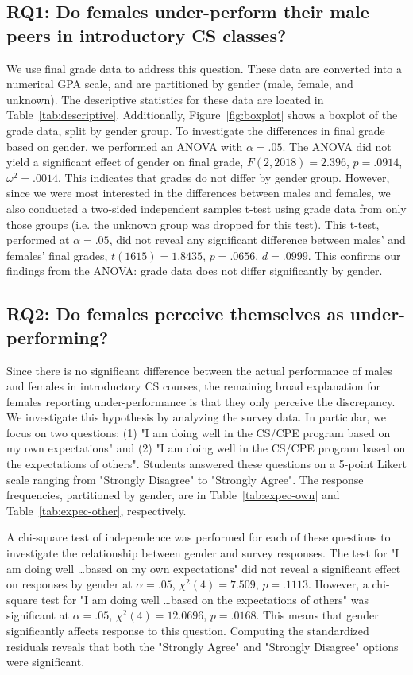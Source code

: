 \documentclass[a4paper,man,natbib]{apa6}
\begin{document}
\subsection{RQ1: Do females under-perform their male peers in introductory CS classes?}
We use final grade data to address this question. These data are converted into a
numerical GPA scale, and are partitioned by gender (male, female, and unknown).
The descriptive statistics for these data are located in Table~\ref{tab:descriptive}.
Additionally, Figure~\ref{fig:boxplot} shows a boxplot of the grade data, split
by gender group. To investigate the differences in final grade based on gender,
we performed an ANOVA with $\alpha = .05$. The ANOVA did not yield a
significant effect of gender on final grade, $F(2,2018)=2.396$, $p=.0914$,
$\omega^2=.0014$. This indicates that grades do not differ by gender group.
However, since we were most interested in the differences between males and
females, we also conducted a two-sided independent samples t-test using grade data from
only those groups (i.e. the unknown group was dropped for this test). This
t-test, performed at $\alpha=.05$, did not reveal any significant difference
between males' and females' final grades, $t(1615)=1.8435$, $p=.0656$,
$d=.0999$. This confirms our findings from the ANOVA: grade data does not
differ significantly by gender.

\subsection{RQ2: Do females perceive themselves as under-performing?}
Since there is no significant difference between the actual performance of
males and females in introductory CS courses, the remaining broad explanation
for females reporting under-performance is that they only perceive the
discrepancy. We investigate this hypothesis by analyzing the survey data. In
particular, we focus on two questions: (1) "I am doing well in the CS/CPE
program based on my own expectations" and (2) "I am doing well in the CS/CPE
program based on the expectations of others". Students answered these questions
on a 5-point Likert scale ranging from "Strongly Disagree" to "Strongly Agree".
The response frequencies, partitioned by gender, are in
Table~\ref{tab:expec-own} and Table~\ref{tab:expec-other}, respectively. 

A chi-square test of independence was performed for each of these questions to
investigate the relationship between gender and survey responses. The test for
"I am doing well \dots based on my own expectations" did not reveal a
significant effect on responses by gender at $\alpha=.05$, $\chi^2(4)=7.509$,
$p=.1113$. However, a chi-square test for "I am doing well \dots based on the
expectations of others" was significant at $\alpha=.05$, $\chi^2(4)=12.0696$,
$p=.0168$. This means that gender significantly affects response to this
question. Computing the standardized residuals reveals that both the "Strongly
Agree" and "Strongly Disagree" options were significant. 
\end{document}
